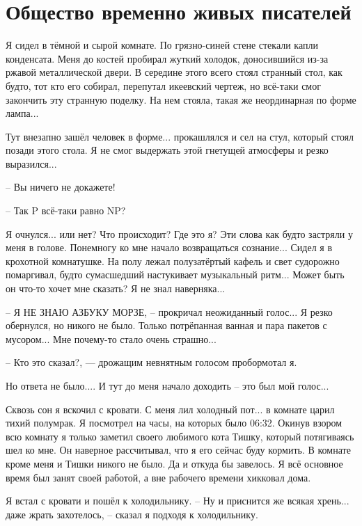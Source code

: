 \section{Общество временно живых писателей}

\asterisks

Я сидел в тёмной и сырой комнате. По грязно-синей стене стекали капли конденсата. Меня до костей пробирал жуткий холодок, доносившийся из-за ржавой металлической двери. В середине этого всего стоял странный стол, как будто, тот кто его собирал, перепутал икеевский чертеж, но всё-таки смог закончить эту странную поделку. На нем стояла, такая же неординарная по форме лампа...

Тут внезапно зашёл человек в форме... прокашлялся и сел на стул, который стоял позади этого стола. Я не смог выдержать этой гнетущей атмосферы и резко выразился...

-- Вы ничего не докажете!

-- Так P всё-таки равно NP?

\asterisks

Я очнулся... или нет? Что происходит? Где это я? Эти слова как будто застряли у меня в голове. Понемногу ко мне начало возвращаться сознание... Сидел я в крохотной комнатушке. На полу лежал полузатёртый кафель и свет судорожно помаргивал, будто сумасшедший настукивает музыкальный ритм... Может быть он что-то хочет мне сказать? Я не знал наверняка...

-- Я НЕ ЗНАЮ АЗБУКУ МОРЗЕ, -- прокричал неожиданный голос...
Я резко обернулся, но никого не было. Только потрёпанная ванная и пара пакетов с мусором... Мне почему-то стало очень страшно...

-- Кто это сказал?, — дрожащим невнятным голосом пробормотал я.

Но ответа не было.... И тут до меня начало доходить -- это был мой голос...

Сквозь сон я вскочил с кровати. С меня лил холодный пот... в комнате царил тихий полумрак. Я посмотрел на часы, на которых было 06:32. Окинув взором всю комнату я только заметил своего любимого кота Тишку, который потягиваясь шел ко мне. Он наверное рассчитывал, что я его сейчас буду кормить. В комнате кроме меня и Тишки никого не было. Да и откуда бы завелось. Я всё основное время был занят своей работой, а вне рабочего времени хикковал дома.

Я встал с кровати и пошёл к холодильнику.
-- Ну и приснится же всякая хрень... даже жрать захотелось, -- сказал я подходя к холодильнику.

